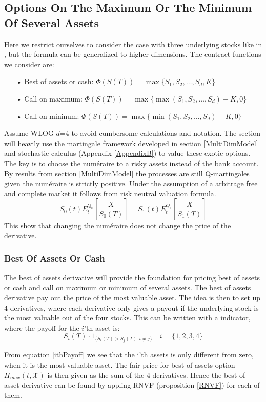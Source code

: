 \subsection{Options On The Maximum Or The Minimum Of Several Assets}
Here we restrict ourselves to consider the case with three underlying stocks like in \parencite{Ouwehand2006}, but the formula can be generalized to higher dimensions. The contract functions we consider are:
\begin{enumerate}
\item[•] Best of assets or cash: $\Phi(S(T))=\max\{S_1,S_2,\ldots,S_d,K\}$
\item[•] Call on maximum: $\Phi(S(T))=\max\{\max(S_1,S_2,\ldots,S_d)-K,0\}$
\item[•] Call on mininum: $\Phi(S(T))=\max\{\min(S_1,S_2,\ldots,S_d)-K,0\}$
\end{enumerate}
Assume WLOG $d$=4 to avoid cumbersome calculations and notation. The section will heavily use the martingale framework developed in section \ref{MultiDimModel} and stochastic calculus (Appendix \ref{AppendixB}) to value these exotic options. The key is to choose the numéraire to a risky assets instead of the bank account. By results from section \ref{MultiDimModel} the processes are still Q-martingales given the numéraire is strictly positive. Under the assumption of a arbitrage free and complete market it follows from risk neutral valuation formula.
$$S_0(t)E^{Q_0}_t[\frac{X}{S_0(T)}]=S_1(t)E^{Q_1}_t[\frac{X}{S_1(T)}]$$
This show that changing the numéraire does not change the price of the derivative.

\subsubsection{Best Of Assets Or Cash}
The best of assets derivative will provide the foundation for pricing best of assets or cash and call on maximum or minimum of several assets. The best of assets derivative pay out the price of the most valuable asset. The idea is then to set up 4 derivatives, where each derivative only gives a payout if the underlying stock is the most valuable out of the four stocks. This can be written with a indicator, where the payoff for the $i$'th asset is:
\begin{equation}\label{ithPayoff}
S_i(T) \cdot 1_{\{S_i(T)>S_j(T): i\neq j\}} \quad i=\{1,2,3,4\}
\end{equation}

From equation \eqref{ithPayoff} we see that the i'th assets is only different from zero, when it is the most valuable asset. The fair price for best of assets option $\Pi_{max}(t,\mathcal{X})$ is then given as the sum of the 4 derivatives. Hence the best of asset derivative can be found by appling RNVF (proposition \ref{RNVF}) for each of them.\\

